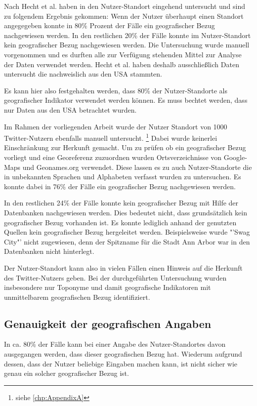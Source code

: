 			Nach Hecht et al. haben in \cite{Hecht2011} den Nutzer-Standort eingehend untersucht und sind zu folgendem Ergebnis gekommen:
			Wenn der Nutzer überhaupt einen Standort angegegeben konnte in 80\% Prozent der Fälle ein geografischer Bezug nachgewiesen werden.
			In den restlichen 20\% der Fälle konnte im Nutzer-Standort kein geografischer Bezug nachgewiesen werden. 
			Die Untersuchung wurde manuell vorgenommen und es durften alle zur Verfügung stehenden Mittel zur Analyse der Daten verwendet werden. 
			Hecht et al. haben deshalb ausschließlich Daten untersucht die nachweislich aus den USA stammten. 

			Es kann hier also festgehalten werden, dass 80\% der Nutzer-Standorte als geografischer Indikator verwendet werden können.
			Es muss bechtet werden, dass nur Daten aus den USA betrachtet wurden.

			Im Rahmen der vorliegenden Arbeit wurde der Nutzer Standort von 1000 Twitter-Nutzern ebenfalls manuell untersucht. \footnote{siehe \ref{chp:AppendixA} }  
			Dabei wurde keinerlei Einschränkung zur Herkunft gemacht.
			Um zu prüfen ob ein geografischer Bezug vorliegt und eine Georeferenz zuzuordnen wurden Ortsverzeichnisse von Google-Maps und Geonames.org verwendet.
			Diese lassen es zu auch Nutzer-Standorte die in unbekannten Sprachen und Alphabeten verfasst wurden zu untersuchen.
			Es konnte dabei in 76\% der Fälle ein geografischer Bezug nachgewiesen werden. 

			In den restlichen 24\% der Fälle konnte kein geografischer Bezug mit Hilfe der Datenbanken nachgewiesen werden. 
			Dies bedeutet nicht, dass grundsätzlich kein geografischer Bezug vorhanden ist. 
			Es konnte lediglich anhand der genutzten Quellen kein geografischer Bezug hergeleitet werden.
			Beispielsweise wurde "'Swag City"' nicht zugewiesen, denn der Spitzname für die Stadt Ann Arbor war in den Datenbanken nicht hinterlegt. 

			Der Nutzer-Standort kann also in vielen Fällen einen Hinweis auf die Herkunft des Twitter-Nutzers geben.
			Bei der durchgeführten Untersuchung wurden insbesondere nur Toponyme und damit geografische Indikatoren mit unmittelbarem geografischen Bezug identifiziert. 

		\subsection*{Genauigkeit der geografischen Angaben}

			In ca. 80\% der Fälle kann bei einer Angabe des Nutzer-Standortes davon ausgegangen werden, dass dieser geografischen Bezug hat.
			Wiederum aufgrund dessen, dass der Nutzer beliebige Eingaben machen kann, ist nicht sicher wie genau ein solcher geografischer Bezug ist. 
			

